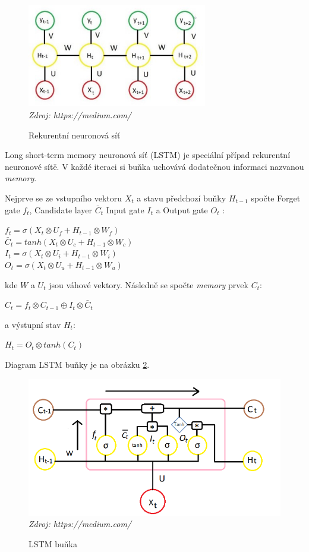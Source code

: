 \begin{figure}[H]
\caption{Rekurentní neuronová síť}
\label{fig:rnn}
\centering
\includegraphics[width=0.7\textwidth]{img/cho/rnn.jpeg}\\
\textit{Zdroj: https://medium.com/}
\end{figure}

Long short-term memory neuronová síť (LSTM) je speciální případ rekurentní neuronové sítě. V každé iteraci si buňka uchovává dodatečnou informaci nazvanou \textit{memory}. 

Nejprve se ze vstupního vektoru $X_{t}$ a stavu předchozí buňky $H_{t-1}$ spočte Forget gate $f_{t}$, Candidate layer $\bar{C}_{t}$ Input gate $I_{t}$ a Output gate $O_{t}$ \citep{cho.lsmt}:

$f_{t}=\sigma(X_{t} \otimes U_{f}+H_{t-1} \otimes W_{f})$\\\indent
$\bar{C}_{t}=tanh(X_{t} \otimes U_{c}+H_{t-1} \otimes W_{c})$\\\indent
$I_{t}=\sigma(X_{t} \otimes U_{i}+H_{t-1} \otimes W_{i})$\\\indent
$O_{t}=\sigma(X_{t} \otimes U_{u}+H_{t-1} \otimes W_{u})$

\noindent kde $W$ a $U_{t}$ jsou váhové vektory. Následně se spočte \textit{memory} prvek $C_{t}$:

$C_{t}=f_{t} \otimes C_{t-1} \oplus I_{t} \otimes \bar{C}_{t}$

\noindent a výstupní stav $H_{t}$:

$H_{t}=O_{t} \otimes tanh(C_{t})$

Diagram LSTM buňky je na obrázku \ref{fig:lstm_cell}.

\begin{figure}[H]
\caption{LSTM buňka}
\label{fig:lstm_cell}
\centering
\includegraphics[width=1\textwidth]{img/cho/lstm_cell.png}
\textit{Zdroj: https://medium.com/}
\end{figure}

